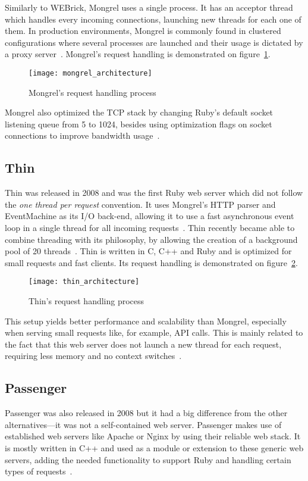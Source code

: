 Similarly to WEBrick, Mongrel uses a single process. It has an acceptor thread which handles every incoming connections, launching new threads for each one of them. In production environments, Mongrel is commonly found in clustered configurations where several processes are launched and their usage is dictated by a proxy server~\cite{mongrel_faq}. Mongrel's request handling is demonstrated on figure~\ref{fig:mongrel_architecture}.
\begin{figure}[h!]
  \centering
    \texttt{[image: mongrel\_architecture]}
  \caption{Mongrel's request handling process}
  \label{fig:mongrel_architecture}
\end{figure}
Mongrel also optimized the TCP stack by changing Ruby's default socket listening queue from 5 to 1024, besides using optimization flags on socket connections to improve bandwidth usage~\cite{mongrel_faq}.


\subsection{Thin}
Thin was released in 2008 and was the first Ruby web server which did not follow the \textit{one thread per request} convention. It uses Mongrel's HTTP parser and EventMachine as its I/O back-end, allowing it to use a fast asynchronous event loop in a single thread for all incoming requests~\cite{thin}. Thin recently became able to combine threading with its philosophy, by allowing the creation of a background pool of 20 threads~\cite{ruby_webservers}. Thin is written in C, C++ and Ruby and is optimized for small requests and fast clients. Its request handling is demonstrated on figure~\ref{fig:thin_architecture}.
\begin{figure}[h!]
  \centering
    \texttt{[image: thin\_architecture]}
  \caption{Thin's request handling process}
  \label{fig:thin_architecture}
\end{figure}
This setup yields better performance and scalability than Mongrel, especially when serving small requests like, for example, API calls. This is mainly related to the fact that this web server does not launch a new thread for each request, requiring less memory and no context switches~\cite{ruby_webservers}.
 

\subsection{Passenger}
Passenger was also released in 2008 but it had a big difference from the other alternatives---it was not a self-contained web server. Passenger makes use of established web servers like Apache or Nginx by using their reliable web stack. It is mostly written in C++ and used as a module or extension to these generic web servers, adding the needed functionality to support Ruby and handling certain types of requests~\cite{passenger_whatis}.

